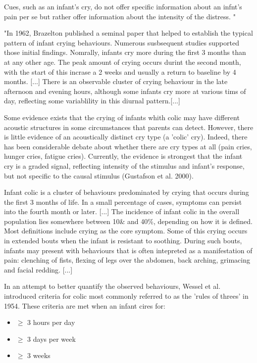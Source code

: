 \documentclass[11pt,twocolumn]{scrartcl}
\begin{document}
Cues, such as an infant's cry, do not offer specific information about an infnt's pain per se but rather offer information about the intensity of the distress.
" \cite{Stevens2006}

"In 1962, Brazelton published a seminal paper that helped to establish the typical pattern of infant crying behaviours. Numerous susbsequent studies supported those initial findings. Nomrally, infants cry more during the first 3 months than at any other age. The peak amount of crying occurs durint the second month, with the start of this incrase a 2 weeks and usually a return to baseline by 4 months. [...] There is an observable cluster of crying behaviour in the late afternoon and evening hours, although some infants cry more at various tims of day, reflecting some variablility in this diurnal pattern.[...]

Some evidence exists that the crying of infants whith colic may have different acoustic structures in some circumstances that parents can detect. However, there is little evidence of an acoustically distinct cry type (a 'colic' cry). Indeed, there has been considerable debate about whether there are cry types at all (pain cries, hunger cries, fatigue cries). Currently, the evidence is strongest that the infant cry is a graded signal, reflecting intensity of the stimulus and infant's response, but not specific to the causal stimulus (Gustafson et al. 2000). 

Infant colic is a cluster of behaviours predominated by crying that occurs during the first 3 months of life. In a small percentage of cases, symptoms can persist into the fourth month or later. [...] The incidence of infant colic in the overall population lies somewhere between 10\& and 40\%, depending on how it is defined. Most definitions include crying as the core symptom. Some of this crying occurs in extended bouts when the infant is resistant to soothing. During such bouts, infants may present with behaviours that is often intepreted as a manifestation of pain: clenching of fists, flexing of legs over the abdomen, back arching, grimacing and facial redding. [...]

In an attempt to better quantify the observed behaviours, Wessel et al. introduced criteria for colic most commonly referred to as the 'rules of threes' in 1954. These criteria are met when an infant cires for:

\begin{itemize}
\item $\geq$ 3 hours per day
\item $\geq$ 3 days per week
\item $\geq$ 3 weeks 
\end{itemize}
\end{document}
